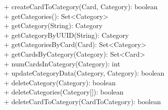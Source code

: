 {
    + createCardToCategory(Card, Category): boolean \\
    + getCategories(): Set<Category> \\
    + getCategory(String): Category \\
    + getCategoryByUUID(String): Category \\
    + getCategoriesByCard(Card): Set<Category> \\
    + getCardsByCategory(Category): Set<Card> \\
    + numCardsInCategory(Category): int \\
    + updateCategoryData(Category, Category): boolean \\
    + deleteCategory(Category): boolean \\
    + deleteCategories(Category[]): boolean \\
    + deleteCardToCategory(CardToCategory): boolean \\
}{}